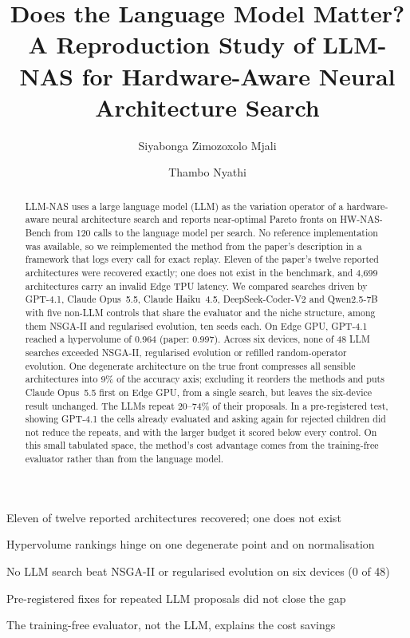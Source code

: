 \documentclass[preprint,12pt]{elsarticle}
\begin{document}
\begin{frontmatter}

\title{Does the Language Model Matter? A Reproduction Study of LLM-NAS for Hardware-Aware Neural Architecture Search}

\author[up_cs]{Siyabonga Zimozoxolo Mjali}
\author[up_cs]{Thambo Nyathi}

\begin{abstract}
LLM-NAS uses a large language model (LLM) as the variation operator of a hardware-aware neural architecture search and reports near-optimal Pareto fronts on HW-NAS-Bench from 120 calls to the language model per search. No reference implementation was available, so we reimplemented the method from the paper's description in a framework that logs every call for exact replay. Eleven of the paper's twelve reported architectures were recovered exactly; one does not exist in the benchmark, and 4{,}699 architectures carry an invalid Edge TPU latency. We compared searches driven by GPT-4.1, Claude Opus~5.5, Claude Haiku~4.5, DeepSeek-Coder-V2 and Qwen2.5-7B with five non-LLM controls that share the evaluator and the niche structure, among them NSGA-II and regularised evolution, ten seeds each. On Edge GPU, GPT-4.1 reached a hypervolume of 0.964 (paper: 0.997). Across six devices, none of 48 LLM searches exceeded NSGA-II, regularised evolution or refilled random-operator evolution. One degenerate architecture on the true front compresses all sensible architectures into 9\% of the accuracy axis; excluding it reorders the methods and puts Claude Opus~5.5 first on Edge GPU, from a single search, but leaves the six-device result unchanged. The LLMs repeat 20--74\% of their proposals. In a pre-registered test, showing GPT-4.1 the cells already evaluated and asking again for rejected children did not reduce the repeats, and with the larger budget it scored below every control. On this small tabulated space, the method's cost advantage comes from the training-free evaluator rather than from the language model.
\end{abstract}

\begin{highlights}
\item Eleven of twelve reported architectures recovered; one does not exist
\item Hypervolume rankings hinge on one degenerate point and on normalisation
\item No LLM search beat NSGA-II or regularised evolution on six devices (0 of 48)
\item Pre-registered fixes for repeated LLM proposals did not close the gap
\item The training-free evaluator, not the LLM, explains the cost savings
\end{highlights}


\end{frontmatter}
\end{document}
